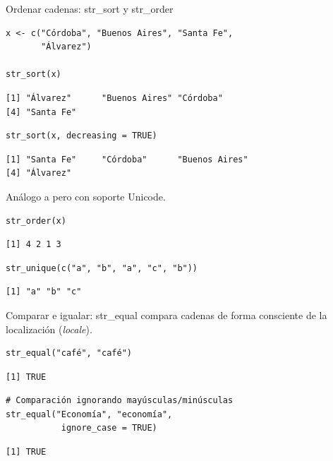 \documentclass[8pt]{beamer}
\begin{document}
\begin{frame}[fragile]{Ordenar cadenas: str\_sort y str\_order}
\begin{lstlisting}[style=RScript]
x <- c("Córdoba", "Buenos Aires", "Santa Fe",
       "Álvarez")

str_sort(x)
\end{lstlisting}
\begin{lstlisting}[style=RConsole]
[1] "Álvarez"      "Buenos Aires" "Córdoba"
[4] "Santa Fe"
\end{lstlisting}
\begin{lstlisting}[style=RScript]
str_sort(x, decreasing = TRUE)
\end{lstlisting}
\begin{lstlisting}[style=RConsole]
[1] "Santa Fe"     "Córdoba"      "Buenos Aires"
[4] "Álvarez"
\end{lstlisting}

	Análogo a  pero con soporte Unicode.
\begin{lstlisting}[style=RScript]
str_order(x)
\end{lstlisting}
\begin{lstlisting}[style=RConsole]
[1] 4 2 1 3
\end{lstlisting}

\begin{lstlisting}[style=RScript]
str_unique(c("a", "b", "a", "c", "b"))
\end{lstlisting}
\begin{lstlisting}[style=RConsole]
[1] "a" "b" "c"
\end{lstlisting}
\end{frame}




\begin{frame}[fragile]{Comparar e igualar: str\_equal}
	 compara cadenas de forma consciente de la localización (\emph{locale}).
\begin{lstlisting}[style=RScript]
str_equal("café", "café")
\end{lstlisting}
\begin{lstlisting}[style=RConsole]
[1] TRUE
\end{lstlisting}
\begin{lstlisting}[style=RScript]
# Comparación ignorando mayúsculas/minúsculas
str_equal("Economía", "economía",
           ignore_case = TRUE)
\end{lstlisting}
\begin{lstlisting}[style=RConsole]
[1] TRUE
\end{lstlisting}
\end{frame}
\end{document}
